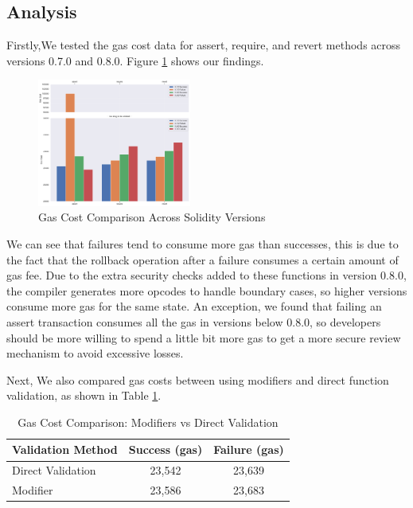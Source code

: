 \documentclass[conference]{IEEEtran}
\begin{document}
\vspace{1em}
\subsection{\textbf{Analysis}}
Firstly,We tested the gas cost data for assert, require, and revert methods across versions 0.7.0 and 0.8.0. Figure \ref{fig:version-comparison} shows our findings.

\begin{figure}[htbp]
    \centering
    \includegraphics[width=0.45\textwidth]{version_comparison.pdf}
    \caption{Gas Cost Comparison Across Solidity Versions}
    \label{fig:version-comparison}
\end{figure}

We can see that failures tend to consume more gas than successes, this is due to the fact that the rollback operation after a failure consumes a certain amount of gas fee. Due to the extra security checks added to these functions in version 0.8.0, the compiler generates more opcodes to handle boundary cases, so higher versions consume more gas for the same state. An exception, we found that failing an assert transaction consumes all the gas in versions below 0.8.0, so developers should be more willing to spend a little bit more gas to get a more secure review mechanism to avoid excessive losses.

\vspace{1em}
Next, We also compared gas costs between using modifiers and direct function validation, as shown in Table \ref{tab:modifier-comparison}.

\begin{table}[htbp]
\renewcommand{\arraystretch}{1.2}
\centering
\caption{Gas Cost Comparison: Modifiers vs Direct Validation}
\begin{tabular}{|l|c|c|}
\hline
\textbf{Validation Method} & \textbf{Success (gas)} & \textbf{Failure (gas)} \\
\hline
Direct Validation & 23,542 & 23,639 \\
\hline
Modifier & 23,586 & 23,683 \\
\hline
\end{tabular}
\label{tab:modifier-comparison}
\end{table}
\end{document}
